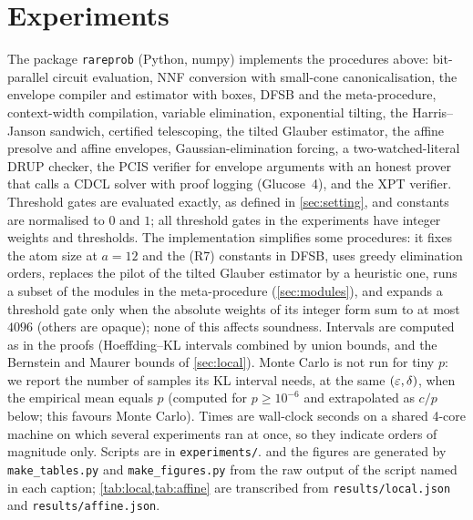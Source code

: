 \section{Experiments}\label{sec:experiments}

The package \texttt{rareprob} (Python, numpy) implements the procedures above:
bit-parallel circuit evaluation, NNF conversion with small-cone
canonicalisation, the envelope compiler and estimator with boxes, DFSB and the
meta-procedure, context-width compilation, variable elimination, exponential tilting,
the Harris--Janson sandwich, certified telescoping, the tilted Glauber estimator, the
affine presolve and affine envelopes, Gaussian-elimination forcing, a
two-watched-literal DRUP checker, the PCIS verifier for envelope arguments with an
honest prover that calls a CDCL solver with proof logging (Glucose~4), and the XPT
verifier. Threshold gates are evaluated exactly, as defined in \cref{sec:setting}, and
constants are normalised to $0$ and $1$; all threshold gates in the experiments have
integer weights and thresholds. The implementation simplifies some
procedures: it fixes the atom size at $a=12$ and the (R7) constants in DFSB, uses
greedy elimination orders, replaces the pilot of the tilted Glauber estimator by a
heuristic one, runs a subset of the modules in the meta-procedure
(\cref{sec:modules}), and expands a threshold gate only when the absolute weights of its
integer form sum to at most $4096$ (others are opaque); none of this affects
soundness. Intervals are computed as in the proofs (Hoeffding--KL intervals combined
by union bounds, and the Bernstein and Maurer bounds of \cref{sec:local}). Monte Carlo
is not run for tiny $p$: we report the number of samples its KL interval needs, at the
same $(\varepsilon,\delta)$, when the empirical mean equals $p$ (computed for $p\ge10^{-6}$ and
extrapolated as $c/p$ below; this favours Monte Carlo). Times are wall-clock seconds on
a shared 4-core machine on which several experiments ran at once, so they indicate
orders of magnitude only. Scripts are in \texttt{experiments/}.
 and the figures
are generated by \texttt{make\_tables.py} and \texttt{make\_figures.py} from the raw
output of the script named in each caption; \cref{tab:local,tab:affine} are transcribed
from \texttt{results/local.json} and \texttt{results/affine.json}.

